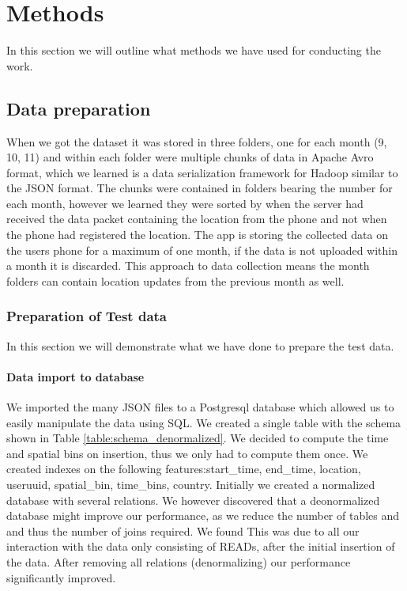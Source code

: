 \chapter{Methods}
\label{chap:methods}

In this section we will outline what methods we have used for conducting the work.
\section{Data preparation}

When we got the dataset it was stored in three folders, one for each month (9, 10, 11) and within each folder were multiple chunks of data in Apache Avro format\cite{apacheavro}, which we learned is a data serialization framework for Hadoop similar to the JSON format. The chunks were contained in folders bearing the number for each month, however we learned they were sorted by when the server had received the data packet containing the location from the phone and not when the phone had registered the location. The app is storing the collected data on the users phone for a maximum of one month, if the data is not uploaded within a month it is discarded. This approach to data collection means the month folders can contain location updates from the previous month as well.


\subsection{Preparation of Test data}
In this section we will demonstrate what we have done to prepare the test data.

\subsubsection{Data import to database}
We imported the many JSON files to a Postgresql database which allowed us to easily manipulate the data using SQL. We created a single table with the schema shown in Table \ref{table:schema_denormalized}. We decided to compute the time and spatial bins on insertion, thus we only had to compute them once. We created indexes on the following features:start\_time, end\_time, location, useruuid, spatial\_bin, time\_bins, country.
Initially we created a normalized database with several relations. We however discovered that a deonormalized database might improve our performance, as we reduce the number of tables and and thus the number of joins required\cite{sanders2001denormalization}. We found This was due to all our interaction with the data only consisting of READs, after the initial insertion of the data. After removing all relations (denormalizing) our performance significantly improved.

